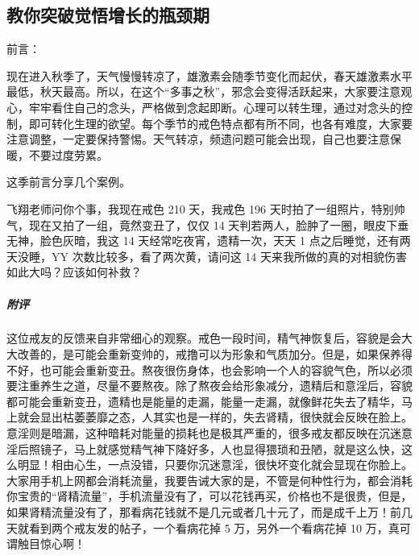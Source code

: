\subsection{教你突破觉悟增长的瓶颈期}

前言：

现在进入秋季了，天气慢慢转凉了，雄激素会随季节变化而起伏，春天雄激素水平最低，秋天最高。所以，在这个“多事之秋”，邪念会变得活跃起来，大家要注意观心，牢牢看住自己的念头，严格做到念起即断。心理可以转生理，通过对念头的控制，即可转化生理的欲望。每个季节的戒色特点都有所不同，也各有难度，大家要注意调整，一定要保持警惕。天气转凉，频遗问题可能会出现，自己也要注意保暖，不要过度劳累。

这季前言分享几个案例。

\begin{case}
    飞翔老师问你个事，我现在戒色 210 天，我戒色 196 天时拍了一组照片，特别帅气，现在又拍了一组，竟然变丑了，仅仅 14 天判若两人，脸肿了一圈，眼皮下垂无神，脸色灰暗，我这 14 天经常吃夜宵，遗精一次，天天 1 点之后睡觉，还有两天没睡，YY 次数比较多，看了两次黄，请问这 14 天来我所做的真的对相貌伤害如此大吗？应该如何补救？
    \subparagraph{附评} 这位戒友的反馈来自非常细心的观察。戒色一段时间，精气神恢复后，容貌是会大大改善的，是可能会重新变帅的，戒撸可以为形象和气质加分。但是，如果保养得不好，也可能会重新变丑。熬夜很伤身体，也会影响一个人的容貌气色，所以必须要注重养生之道，尽量不要熬夜。除了熬夜会给形象减分，遗精后和意淫后，容貌都可能会重新变丑，遗精也是能量的走漏，能量一走漏，就像鲜花失去了精华，马上就会显出枯萎萎靡之态，人其实也是一样的，失去肾精，很快就会反映在脸上。意淫则是暗漏，这种暗耗对能量的损耗也是极其严重的，很多戒友都反映在沉迷意淫后照镜子，马上就感觉精气神下降好多，人也显得猥琐和丑陋，就是这么快，这么明显！相由心生，一点没错，只要你沉迷意淫，很快坏变化就会显现在你脸上。大家用手机上网都会消耗流量，我要告诫大家的是，不管是何种性行为，都会消耗你宝贵的“肾精流量”，手机流量没有了，可以花钱再买，价格也不是很贵，但是，如果肾精流量没有了，那看病花钱就不是几元或者几十元了，而是成千上万！前几天就看到两个戒友发的帖子，一个看病花掉 5 万，另外一个看病花掉 10 万，真可谓触目惊心啊！
\end{case}


